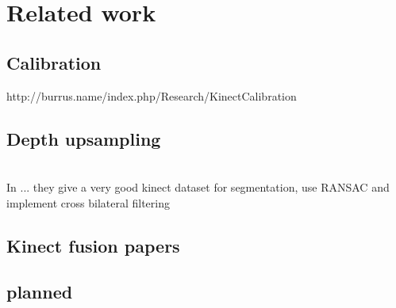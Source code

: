 \documentclass{ucl_thesis}
\begin{document}
\chapter{Related work} 
\label{chp:related_work}

\section{Calibration}
http://burrus.name/index.php/Research/KinectCalibration

\section{Depth upsampling}
\citep{MatsuoFI13} \\

In \citep{Silberman:ECCV12} ... they give a very good kinect dataset for segmentation, use RANSAC and implement cross bilateral filtering

\section{Kinect fusion papers}
\citep{Chen:2013:Scalable_volumetric}
\section{planned}
\end{document}
